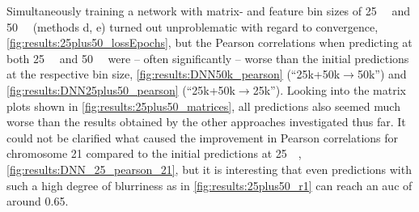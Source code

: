 Simultaneously training a network with matrix- and feature bin sizes of \SI{25}{\kilo\bp} and \SI{50}{\kilo\bp} (methods d, e)
turned out unproblematic with regard to convergence, \cref{fig:results:25plus50_lossEpochs}, 
but the Pearson correlations when predicting at both \SI{25}{\kilo\bp} and \SI{50}{\kilo\bp} were -- often significantly -- worse
than the initial predictions at the respective bin size, \cref{fig:results:DNN50k_pearson} (``25k+50k$\rightarrow$50k'') and \cref{fig:results:DNN25plus50_pearson} (``25k+50k$\rightarrow$25k'').
Looking into the matrix plots shown in \cref{fig:results:25plus50_matrices}, 
all predictions also seemed much worse than the results obtained by the other approaches investigated thus far.
It could not be clarified what caused the improvement in Pearson correlations for chromosome 21 compared to the initial predictions at \SI{25}{\kilo\bp}, 
\cref{fig:results:DNN_25_pearson_21}, but it is interesting that even predictions with such a high degree of blurriness as in \cref{fig:results:25plus50_r1}
can reach an \acrshort{auc} of around 0.65.

